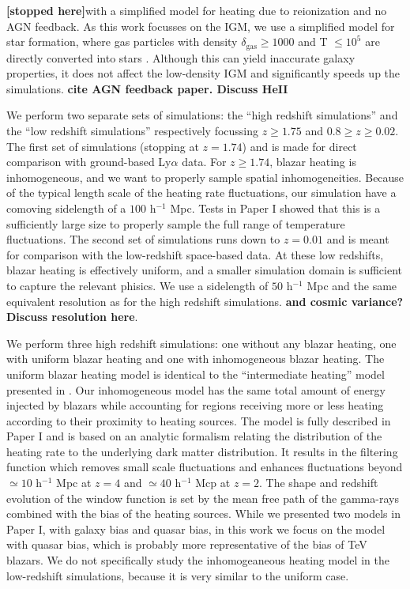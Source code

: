 \documentclass[numberedappendix]{emulateapj}
\newcommand\ALc[1]{{\color{red} \bf #1}} %
\begin{document}
\ALc{[stopped here]}with a simplified model for heating due to reionization and no AGN feedback. As this work focusses on the IGM, we use a simplified model for star formation, where gas particles with  density $\delta_{\mathrm{gas}}\geq 1000$ and T $\leq 10^5$ are directly converted into stars \citep{2004MNRAS.354..684V}. Although this can yield inaccurate galaxy properties, it does not affect the low-density IGM and significantly speeds up the simulations. \ALc{cite AGN feedback paper. Discuss HeII}


We perform two separate sets of simulations: the ``high redshift simulations'' and the ``low redshift simulations''  respectively focussing $z\geq 1.75$ and $0.8\geq z\geq 0.02$. The first set of simulations (stopping at $z=1.74$) and is made for direct comparison with ground-based Ly$\alpha$ data. For $z\geq 1.74$, blazar heating is inhomogeneous, and we want to properly sample spatial inhomogeneities. Because of the typical length scale of the heating rate fluctuations, our simulation have a comoving sidelength of  a $100$ h$^{-1}$ Mpc.  Tests in Paper I showed that this is a sufficiently large size to properly sample the full range of temperature fluctuations. The second set of simulations runs down to $z=0.01$ and is meant for comparison with the low-redshift space-based data. At these low redshifts, blazar heating is effectively uniform, and  a smaller simulation domain is sufficient to capture the relevant phisics. We use a sidelength of $50$ h$^{-1}$ Mpc and the same equivalent resolution as for the high redshift simulations.
 \ALc{and cosmic variance?}\ALc{Discuss resolution here}. 


We perform three high redshift simulations: one without any blazar heating, one with uniform blazar heating and one with inhomogeneous blazar heating.  The uniform blazar heating model is identical to the ``intermediate heating'' model presented in \citet{2012MNRAS.423..149P}.  Our inhomogeneous model has the same total amount of energy injected by blazars while accounting for regions receiving more or less heating according to their proximity to heating sources. The model is fully described in Paper I  and is based on an analytic formalism relating the distribution of the heating rate to the underlying dark matter distribution. It results in the  filtering function which  removes small scale fluctuations and enhances fluctuations beyond $\simeq 10$ h$^{-1}$ Mpc at $z=4$ and $\simeq 40$ h$^{-1}$ Mcp at $z=2$.  The shape and redshift evolution of the  window function is set by the mean free path of the gamma-rays combined with the bias of the heating sources.  While we presented two models in Paper I, with galaxy bias and quasar bias, in this work we focus on the model with quasar bias, which is probably more representative of the bias of TeV blazars.  We do not specifically study the inhomogeaneous heating model in the low-redshift simulations, because it is very similar to the uniform case.
\end{document}
